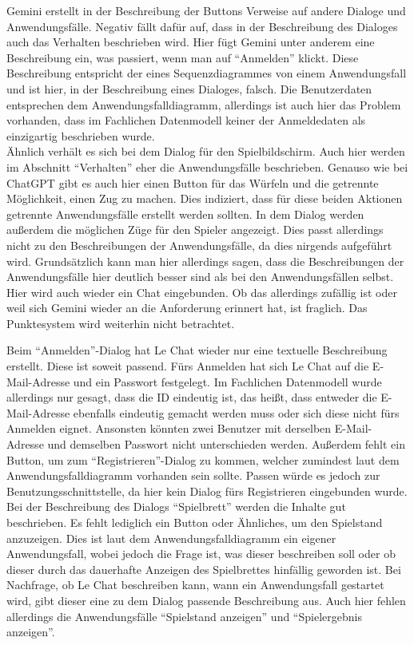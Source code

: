 Gemini erstellt in der Beschreibung der Buttons Verweise auf andere Dialoge und Anwendungsfälle. Negativ fällt dafür auf, dass in der 
Beschreibung des Dialoges auch das Verhalten beschrieben wird. Hier fügt Gemini unter anderem eine Beschreibung ein, was passiert, wenn man 
auf ``Anmelden'' klickt. Diese Beschreibung entspricht der eines Sequenzdiagrammes von einem Anwendungsfall und ist hier, in der Beschreibung 
eines Dialoges, falsch. Die Benutzerdaten entsprechen dem Anwendungsfalldiagramm, allerdings ist auch hier das Problem vorhanden, dass im 
Fachlichen Datenmodell keiner der Anmeldedaten als einzigartig beschrieben wurde.\\
Ähnlich verhält es sich bei dem Dialog für den Spielbildschirm. Auch hier werden im Abschnitt ``Verhalten'' eher die Anwendungsfälle beschrieben. 
Genauso wie bei ChatGPT gibt es auch hier einen Button für das Würfeln und die getrennte Möglichkeit, einen Zug zu machen. Dies indiziert, dass 
für diese beiden Aktionen getrennte Anwendungsfälle erstellt werden sollten. In dem Dialog werden außerdem die möglichen Züge für den Spieler 
angezeigt. Dies passt allerdings nicht zu den Beschreibungen der Anwendungsfälle, da dies nirgends aufgeführt wird. Grundsätzlich kann man hier 
allerdings sagen, dass die Beschreibungen der Anwendungsfälle hier deutlich besser sind als bei den Anwendungsfällen selbst. Hier wird auch 
wieder ein Chat eingebunden. Ob das allerdings zufällig ist oder weil sich Gemini wieder an die Anforderung erinnert hat, ist fraglich. Das 
Punktesystem wird weiterhin nicht betrachtet.

Beim ``Anmelden''-Dialog hat Le Chat wieder nur eine textuelle Beschreibung erstellt. Diese ist soweit passend. Fürs Anmelden hat sich Le Chat 
auf die E-Mail-Adresse und ein Passwort festgelegt. Im Fachlichen Datenmodell wurde allerdings nur gesagt, dass die ID eindeutig ist, das 
heißt, dass entweder die E-Mail-Adresse ebenfalls eindeutig gemacht werden muss oder sich diese nicht fürs Anmelden eignet. Ansonsten könnten 
zwei Benutzer mit derselben E-Mail-Adresse und demselben Passwort nicht unterschieden werden. Außerdem fehlt ein Button, um zum 
``Registrieren''-Dialog zu kommen, welcher zumindest laut dem Anwendungsfalldiagramm vorhanden sein sollte. Passen würde es jedoch zur 
Benutzungsschnittstelle, da hier kein Dialog fürs Registrieren eingebunden wurde.\\
Bei der Beschreibung des Dialogs ``Spielbrett'' werden die Inhalte gut beschrieben. Es fehlt lediglich ein Button oder Ähnliches, um den 
Spielstand anzuzeigen. Dies ist laut dem Anwendungsfalldiagramm ein eigener Anwendungsfall, wobei jedoch die Frage ist, was dieser beschreiben 
soll oder ob dieser durch das dauerhafte Anzeigen des Spielbrettes hinfällig geworden ist. Bei Nachfrage, ob Le Chat beschreiben kann, wann 
ein Anwendungsfall gestartet wird, gibt dieser eine zu dem Dialog passende Beschreibung aus. Auch hier fehlen allerdings die Anwendungsfälle 
``Spielstand anzeigen'' und ``Spielergebnis anzeigen''.

